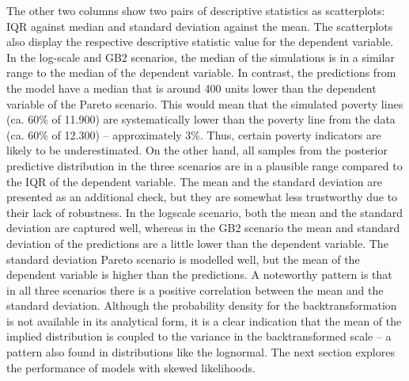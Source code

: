 The other two columns show two pairs of descriptive statistics as scatterplots: IQR against median and standard deviation against the mean.
The scatterplots also display the respective descriptive statistic value for the dependent variable.
In the log-scale and GB2 scenarios, the median of the simulations is in a similar range to the median of the dependent variable.
In contrast, the predictions from the model have a median that is around 400 units lower than the dependent variable of the Pareto scenario.
This would mean that the simulated poverty lines (ca. 60\% of 11.900) are systematically lower than the poverty line from the data (ca. 60\% of 12.300) – approximately 3\%.
Thus, certain poverty indicators are likely to be underestimated.
On the other hand, all samples from the posterior predictive distribution in the three scenarios are in a plausible range compared to the IQR of the dependent variable.
The mean and the standard deviation are presented as an additional check, but they are somewhat less trustworthy due to their lack of robustness.
In the logscale scenario, both the mean and the standard deviation are captured well, whereas in the GB2 scenario the mean and standard deviation of the predictions are a little lower than the dependent variable.
The standard deviation Pareto scenario is modelled well, but the mean of the dependent variable is higher than the predictions.
A noteworthy pattern is that in all three scenarios there is a positive correlation between the mean and the standard deviation.
Although the probability density for the backtransformation is not available in its analytical form, it is a clear indication that the mean of the implied distribution is coupled to the variance in the backtransformed scale – a pattern also found in distributions like the lognormal.
The next section explores the performance of models with skewed likelihoods.

